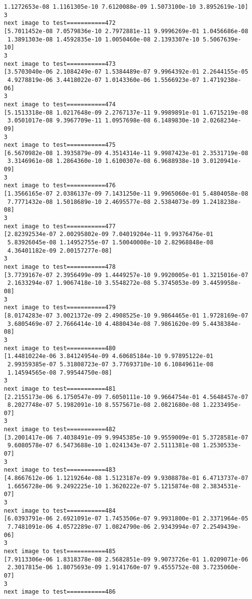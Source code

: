 \documentclass[11pt]{article}
\begin{document}
\begin{Verbatim}[commandchars=\\\{\}]
 1.1272653e-08 1.1161305e-10 7.6120088e-09 1.5073100e-10 3.8952619e-10]
3
next image to test===========472
[5.7011452e-08 7.0579836e-10 2.7972881e-11 9.9996269e-01 1.0456686e-08
 1.3891303e-08 1.4592835e-10 1.0050460e-08 2.1393307e-10 5.5067639e-10]
3
next image to test===========473
[3.5703040e-06 2.1084249e-07 1.5384489e-07 9.9964392e-01 2.2644155e-05
 4.9278819e-06 3.4418022e-07 1.0143360e-06 1.5566923e-07 1.4719238e-06]
3
next image to test===========474
[5.1513318e-08 1.0217648e-09 2.2767137e-11 9.9989891e-01 1.6715219e-08
 3.0501017e-08 9.3967709e-11 1.0957698e-08 6.1489830e-10 2.0268234e-09]
3
next image to test===========475
[6.5670982e-08 1.3935879e-09 4.3514314e-11 9.9987423e-01 2.3531719e-08
 3.3146961e-08 1.2864360e-10 1.6100307e-08 6.9688938e-10 3.0120941e-09]
3
next image to test===========476
[1.3566165e-07 2.0386137e-09 7.1431250e-11 9.9965060e-01 5.4804058e-08
 7.7771432e-08 1.5018689e-10 2.4695577e-08 2.5384073e-09 1.2418238e-08]
3
next image to test===========477
[2.82392534e-07 2.00295802e-09 7.04019204e-11 9.99376476e-01
 5.83926045e-08 1.14952755e-07 1.50040008e-10 2.82968848e-08
 4.36401182e-09 2.00157277e-08]
3
next image to test===========478
[3.7739167e-07 2.3956499e-09 1.4449257e-10 9.9920005e-01 1.3215016e-07
 2.1633294e-07 1.9067418e-10 3.5548272e-08 5.3745053e-09 3.4459958e-08]
3
next image to test===========479
[8.0174283e-07 3.0021372e-09 2.4908525e-10 9.9864465e-01 1.9728169e-07
 3.6805469e-07 2.7666414e-10 4.4880434e-08 7.9861620e-09 5.4438384e-08]
3
next image to test===========480
[1.44810224e-06 3.84124954e-09 4.60685184e-10 9.97895122e-01
 2.99359385e-07 5.31808723e-07 3.77693710e-10 6.10849611e-08
 1.14594565e-08 7.99544750e-08]
3
next image to test===========481
[2.2155173e-06 6.1750547e-09 7.6050111e-10 9.9664754e-01 4.5648457e-07
 8.2027748e-07 5.1982091e-10 8.5575671e-08 2.0821680e-08 1.2233495e-07]
3
next image to test===========482
[3.2001417e-06 7.4038491e-09 9.9945385e-10 9.9559009e-01 5.3728581e-07
 9.6080578e-07 6.5473688e-10 1.0241343e-07 2.5111381e-08 1.2530533e-07]
3
next image to test===========483
[4.8667612e-06 1.1219264e-08 1.5123187e-09 9.9308878e-01 6.4713737e-07
 1.6656728e-06 9.2492225e-10 1.3620222e-07 5.1215874e-08 2.3834531e-07]
3
next image to test===========484
[6.0393791e-06 2.6921091e-07 1.7453506e-07 9.9931800e-01 2.3371964e-05
 7.7481091e-06 4.0572289e-07 1.0824790e-06 2.9343994e-07 2.2549439e-06]
3
next image to test===========485
[7.9113306e-06 1.8318378e-08 2.5682851e-09 9.9073726e-01 1.0209071e-06
 2.3017815e-06 1.8075693e-09 1.9141760e-07 9.4555752e-08 3.7235060e-07]
3
next image to test===========486

\end{Verbatim}
\end{document}
